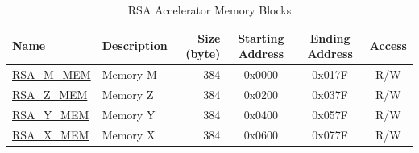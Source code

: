 \begin{longtable}{ | p{3cm} | p{3cm} | r | c | c | c | }
\caption{RSA Accelerator Memory Blocks} \label{regdesc:RSAmemory}
\\ \hline
\rowcolor{lightgray}
Name & Description  &  Size (byte)  &  Starting Address  &  Ending Address  & Access   \\ \hline

\hyperref[regdesc:RSAmemory]{RSA\_M\_MEM} & Memory M  & 384  & 0x0000 & 0x017F & R/W \\ \hline
\hyperref[regdesc:RSAmemory]{RSA\_Z\_MEM} & Memory Z  & 384  & 0x0200 & 0x037F & R/W \\ \hline
\hyperref[regdesc:RSAmemory]{RSA\_Y\_MEM} & Memory Y  & 384  & 0x0400 & 0x057F & R/W \\ \hline
\hyperref[regdesc:RSAmemory]{RSA\_X\_MEM} & Memory X  & 384  & 0x0600 & 0x077F & R/W \\ \hline

\end{longtable}
